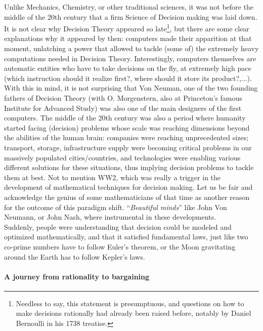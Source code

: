 Unlike Mechanics, Chemistry, or other traditional sciences, it was not before the middle of the 20th century that a firm Science of Decision making was laid down.  It is not clear why Decision Theory appeared so late\footnote{Needless to say, this statement is presumptuous, and questions on how to make decisions rationally had already been raised before, notably by Daniel Bernoulli in his 1738 treatise.}, but there are some clear explanations why it appeared by then: computers made their apparition at that moment, unlatching a power that allowed to tackle (some of) the extremely heavy computations needed in Decision Theory.  Interestingly, computers themselves are automatic entities who have to take decisions on the fly, at extremely high pace (which instruction should it realize first?, where should it store its product?,...).  With this in mind, it is not surprising that Von Neuman, one of the two founding fathers of Decision Theory (with O. Morgenstern, also at Princeton's famous Institute for Advanced Study) was also one of the main designers of the first computers.
The middle of the 20th century was also a period where humanity started facing (decision) problems whose scale was reaching dimensions beyond the abilities of the human brain: companies were reaching unprecedented sizes; transport, storage, infrastructure supply were becoming critical problems in our massively populated cities/countries, and technologies were enabling various different solutions for these situations, thus implying decision problems to tackle them at best.  Not to mention WW2, which was really a trigger in the development of mathematical techniques for decision making.
Let us be fair and acknowledge the genius of some mathematicians of that time as another reason for the outcome of this paradigm shift. ``\emph{Beautiful minds}'' like John Von Neumann, or John Nash, where instrumental in these developments.\\
Suddenly, people were understanding that decision could be modeled and optimized mathematically, and that it satisfied fundamental laws, just like two co-prime numbers have to follow Euler's theorem, or the Moon gravitating around the Earth has to follow Kepler's laws.

\paragraph{A journey from rationality to bargaining}

